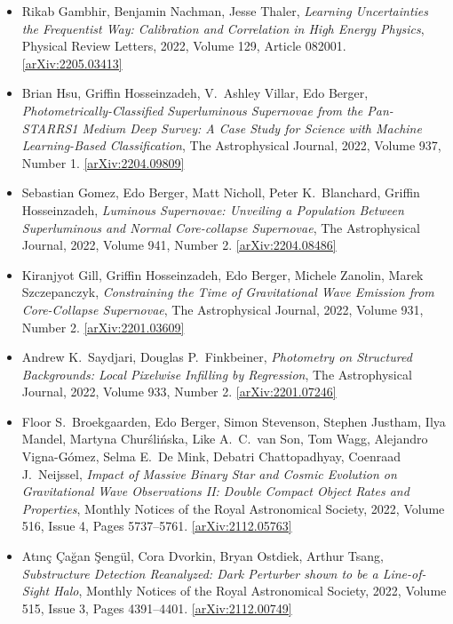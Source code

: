 \begin{itemize}
\item Rikab Gambhir, Benjamin Nachman, Jesse Thaler, \textit{Learning Uncertainties the Frequentist Way: Calibration and Correlation in High Energy Physics}, Physical Review Letters, 2022, Volume 129, Article 082001. \href{https://arxiv.org/abs/2205.03413}{[arXiv:2205.03413]} 
\item Brian Hsu, Griffin Hosseinzadeh, V.\  Ashley Villar, Edo Berger, \textit{Photometrically-Classified Superluminous Supernovae from the Pan-STARRS1 Medium Deep Survey: A Case Study for Science with Machine Learning-Based Classification}, The Astrophysical Journal, 2022, Volume 937, Number 1. \href{https://arxiv.org/abs/2204.09809}{[arXiv:2204.09809]} 
\item Sebastian Gomez, Edo Berger, Matt Nicholl, Peter K.\  Blanchard, Griffin Hosseinzadeh, \textit{Luminous Supernovae: Unveiling a Population Between Superluminous and Normal Core-collapse Supernovae}, The Astrophysical Journal, 2022, Volume 941, Number 2. \href{https://arxiv.org/abs/2204.08486}{[arXiv:2204.08486]} 
\item Kiranjyot Gill, Griffin Hosseinzadeh, Edo Berger, Michele Zanolin, Marek Szczepanczyk, \textit{Constraining the Time of Gravitational Wave Emission from Core-Collapse Supernovae}, The Astrophysical Journal, 2022, Volume 931, Number 2. \href{https://arxiv.org/abs/2201.03609}{[arXiv:2201.03609]} 
\item Andrew K.\  Saydjari, Douglas P.\  Finkbeiner, \textit{Photometry on Structured Backgrounds: Local Pixelwise Infilling by Regression}, The Astrophysical Journal, 2022, Volume 933, Number 2. \href{https://arxiv.org/abs/2201.07246}{[arXiv:2201.07246]} 
\item Floor S.\  Broekgaarden, Edo Berger, Simon Stevenson, Stephen Justham, Ilya Mandel, Martyna Churślińska, Like A.\  C.\  van Son, Tom Wagg, Alejandro Vigna-Gómez, Selma E.\  De Mink, Debatri Chattopadhyay, Coenraad J.\  Neijssel, \textit{Impact of Massive Binary Star and Cosmic Evolution on Gravitational Wave Observations II: Double Compact Object Rates and Properties}, Monthly Notices of the Royal Astronomical Society, 2022, Volume 516, Issue 4, Pages 5737–5761. \href{https://arxiv.org/abs/2112.05763}{[arXiv:2112.05763]} 
\item Atınç Çağan Şengül, Cora Dvorkin, Bryan Ostdiek, Arthur Tsang, \textit{Substructure Detection Reanalyzed: Dark Perturber shown to be a Line-of-Sight Halo}, Monthly Notices of the Royal Astronomical Society, 2022, Volume 515, Issue 3, Pages 4391–4401. \href{https://arxiv.org/abs/2112.00749}{[arXiv:2112.00749]} 

\end{itemize}
